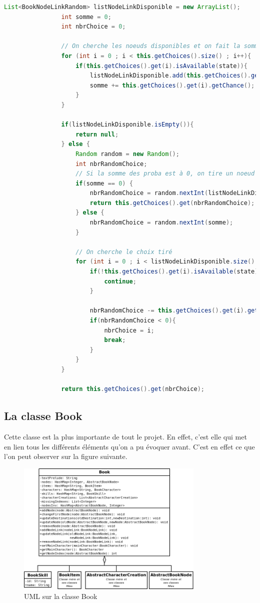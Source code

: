 			\begin{lstlisting}[gobble=16, language=java, label=lst:getRandomChoices, caption=getRandomChoice()]
				List<BookNodeLinkRandom> listNodeLinkDisponible = new ArrayList();
				int somme = 0;
				int nbrChoice = 0;

				// On cherche les noeuds disponibles et on fait la somme des probabilités
				for (int i = 0 ; i < this.getChoices().size() ; i++){
					if(this.getChoices().get(i).isAvailable(state)){
						listNodeLinkDisponible.add(this.getChoices().get(i));
						somme += this.getChoices().get(i).getChance();
					}
				}

				if(listNodeLinkDisponible.isEmpty()){
					return null;
				} else {
					Random random = new Random();
					int nbrRandomChoice;
					// Si la somme des proba est à 0, on tire un noeud au hasard
					if(somme == 0) {
						nbrRandomChoice = random.nextInt(listNodeLinkDisponible.size());
						return this.getChoices().get(nbrRandomChoice);
					} else {
						nbrRandomChoice = random.nextInt(somme);
					}

					// On cherche le choix tiré
					for (int i = 0 ; i < listNodeLinkDisponible.size() ; i++){
						if(!this.getChoices().get(i).isAvailable(state)){
							continue;
						}

						nbrRandomChoice -= this.getChoices().get(i).getChance();
						if(nbrRandomChoice < 0){
							nbrChoice = i;
							break;
						}
					}
				}

				return this.getChoices().get(nbrChoice);
			\end{lstlisting}

		\subsection{La classe Book}
			\label{sub:book}

			Cette classe est la plus importante de tout le projet. En effet, c'est elle qui met en lien tous les différents éléments qu'on a pu évoquer avant. C'est en effet ce que l'on peut observer sur la figure suivante.

			\begin{figure}[H]
				\centering\includegraphics[width=0.8\textwidth, keepaspectratio]{img/book.png}
				\caption{UML sur la classe Book}
			\end{figure}


